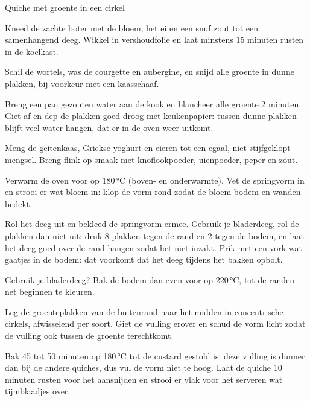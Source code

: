 \begin{recipe}{Quiche met groente in een cirkel}
\begin{steps}
  \item Kneed de zachte boter met de bloem, het ei en een snuf zout tot een
        samenhangend deeg. Wikkel in vershoudfolie en laat minstens 15 minuten
        rusten in de koelkast.
  \item Schil de wortels, was de courgette en aubergine, en snijd alle groente
        in dunne plakken, bij voorkeur met een kaasschaaf.
  \item Breng een pan gezouten water aan de kook en blancheer alle groente 2
        minuten. Giet af en dep de plakken goed droog met keukenpapier: tussen
        dunne plakken blijft veel water hangen, dat er in de oven weer uitkomt.
  \item Meng de geitenkaas, Griekse yoghurt en eieren tot een egaal, niet
        stijfgeklopt mengsel. Breng flink op smaak met knoflookpoeder,
        uienpoeder, peper en zout.
  \item Verwarm de oven voor op 180\,°C (boven- en onderwarmte). Vet de springvorm
        in en strooi er wat bloem in: klop de vorm rond zodat de bloem bodem en
        wanden bedekt.
  \item Rol het deeg uit en bekleed de springvorm ermee. Gebruik je
        bladerdeeg, rol de plakken dan niet uit: druk 8 plakken tegen de rand
        en 2 tegen de bodem, en laat het deeg goed over de rand hangen zodat
        het niet inzakt. Prik met een vork wat gaatjes in de bodem: dat
        voorkomt dat het deeg tijdens het bakken opbolt.
  \item Gebruik je bladerdeeg? Bak de bodem dan even voor op 220\,°C, tot de
        randen net beginnen te kleuren.
  \item Leg de groenteplakken van de buitenrand naar het midden in
        concentrische cirkels, afwisselend per soort. Giet de vulling erover
        en schud de vorm licht zodat de vulling ook tussen de groente
        terechtkomt.
  \item Bak 45 tot 50 minuten op 180\,°C tot de custard gestold is: deze
        vulling is dunner dan bij de andere quiches, dus vul de vorm niet te
        hoog. Laat de quiche 10 minuten rusten voor het aansnijden en strooi
        er vlak voor het serveren wat tijmblaadjes over.
\end{steps}

\end{recipe}
